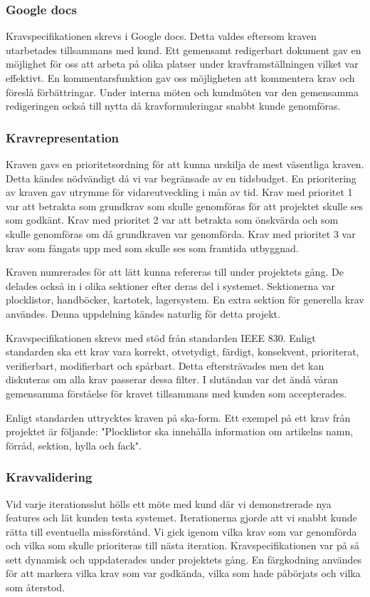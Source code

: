 \documentclass{article}
\begin{document}
\subsubsection{Google docs}
Kravspecifikationen skrevs i Google docs. Detta valdes eftersom kraven utarbetades tillsammans med kund. Ett gemensamt redigerbart dokument gav en möjlighet för oss att arbeta på olika platser under kravframställningen vilket var effektivt. En kommentarsfunktion gav oss möjligheten att kommentera krav och föreslå förbättringar. Under interna möten och kundmöten var den gemensamma redigeringen också till nytta då kravformuleringar snabbt kunde genomföras.
\subsubsection{Kravrepresentation}
Kraven gavs en prioritetsordning för att kunna urskilja de mest väsentliga kraven. Detta kändes nödvändigt då vi var begränsade av en tidsbudget. En prioritering av kraven gav utrymme för vidareutveckling i mån av tid. Krav med prioritet 1 var att betrakta som grundkrav som skulle genomföras för att projektet skulle ses som godkänt. Krav med prioritet 2 var att betrakta som önskvärda och som skulle genomföras om då grundkraven var genomförda. Krav med prioritet 3 var krav som fångats upp med som skulle ses som framtida utbyggnad. 

Kraven numrerades för att lätt kunna refereras till under projektets gång. De delades också in i olika sektioner efter deras del i systemet. Sektionerna var plocklistor, handböcker, kartotek, lagersystem. En extra sektion för generella krav användes. Denna uppdelning kändes naturlig för detta projekt. 

Kravspecifikationen skrevs med stöd från standarden IEEE 830. Enligt standarden ska ett krav vara korrekt, otvetydigt, färdigt, konsekvent, prioriterat, verifierbart, modifierbart och spårbart. Detta eftersträvades men det kan diskuteras om alla krav passerar dessa filter. I slutändan var det ändå våran gemensamma förståelse för kravet tillsammans med kunden som accepterades. 

Enligt standarden uttrycktes kraven på ska-form. Ett exempel på ett krav från projektet är följande: "Plocklistor ska innehålla information om artikelns namn, förråd, sektion, hylla och fack".
\subsubsection{Kravvalidering}
Vid varje iterationsslut hölls ett möte med kund där vi demonstrerade nya features och lät kunden testa systemet. Iterationerna gjorde att vi snabbt kunde rätta till eventuella missförstånd. Vi gick igenom vilka krav som var genomförda och vilka som skulle prioriteras till nästa iteration. Kravspecifikationen var på så sett dynamisk och uppdaterades under projektets gång. En färgkodning användes för att markera vilka krav som var godkända, vilka som hade påbörjats och vilka som återstod.
\end{document}
